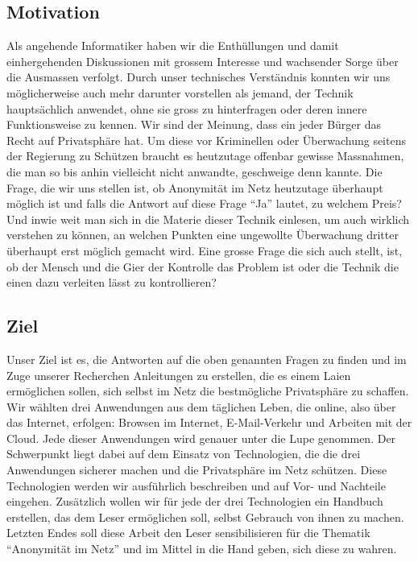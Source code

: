 \subsection{Motivation}
Als angehende Informatiker haben wir die Enthüllungen und damit einhergehenden Diskussionen mit grossem Interesse und wachsender Sorge über die Ausmassen verfolgt. Durch unser technisches Verständnis konnten wir uns möglicherweise auch mehr darunter vorstellen als jemand, der Technik hauptsächlich anwendet, ohne sie gross zu hinterfragen oder deren innere Funktionsweise zu kennen. Wir sind der Meinung, dass ein jeder Bürger das Recht auf Privatsphäre hat. Um diese vor Kriminellen oder Überwachung seitens der Regierung zu Schützen braucht es heutzutage offenbar gewisse Massnahmen, die man so bis anhin vielleicht nicht anwandte, geschweige denn kannte. Die Frage, die wir uns stellen ist, ob Anonymität im Netz heutzutage überhaupt möglich ist und falls die Antwort auf diese Frage ``Ja'' lautet, zu welchem Preis? Und inwie weit man sich in die Materie dieser Technik einlesen, um auch wirklich verstehen zu können, an welchen Punkten eine ungewollte Überwachung dritter überhaupt erst möglich gemacht wird. Eine grosse Frage die sich auch stellt, ist, ob der Mensch und die Gier der Kontrolle das Problem ist oder die Technik die einen dazu verleiten lässt zu kontrollieren?


\subsection{Ziel}
Unser Ziel ist es, die Antworten auf die oben genannten Fragen zu finden und im Zuge unserer Recherchen Anleitungen zu erstellen, die es einem Laien ermöglichen sollen, sich selbst im Netz die bestmögliche Privatsphäre zu schaffen. Wir wählten drei Anwendungen aus dem täglichen Leben, die online, also über das Internet, erfolgen: Browsen im Internet, E-Mail-Verkehr und Arbeiten mit der Cloud. Jede dieser Anwendungen wird genauer unter die Lupe genommen. Der Schwerpunkt liegt dabei auf dem Einsatz von Technologien, die die drei Anwendungen sicherer machen und die Privatsphäre im Netz schützen. Diese Technologien werden wir ausführlich beschreiben und auf Vor- und Nachteile eingehen. Zusätzlich wollen wir für jede der drei Technologien ein Handbuch erstellen, das dem Leser ermöglichen soll, selbst Gebrauch von ihnen zu machen. Letzten Endes soll diese Arbeit den Leser sensibilisieren für die Thematik ``Anonymität im Netz'' und im Mittel in die Hand geben, sich diese zu wahren.
